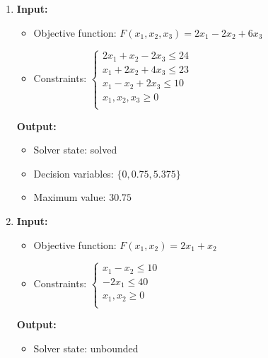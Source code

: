 \documentclass{article}
\begin{document}
\begin{enumerate}[label={(\arabic*)}]
          \vspace{0.25in}

    \item \textbf{Input:}
          \begin{itemize}
              \item Objective function: \(F(x_1, x_2, x_3) = 2 x_1 - 2 x_2 + 6 x_3\)
              \item Constraints: \(\begin{cases}
                        2 x_1 + x_2 - 2 x_3 \le 24 \\
                        x_1 + 2 x_2 + 4 x_3 \le 23 \\
                        x_1 - x_2 + 2 x_3 \le 10   \\
                        x_1, x_2, x_3 \ge 0        \\
                    \end{cases}\)
          \end{itemize}

          \textbf{Output:}
          \begin{itemize}
              \item Solver state: solved
              \item Decision variables: \({\{ 0, 0.75, 5.375 \}}\)
              \item Maximum value: \(30.75\)
          \end{itemize}

          \vspace{0.25in}

    \item \textbf{Input:}
          \begin{itemize}
              \item Objective function: \(F(x_1, x_2) = 2 x_1 + x_2\)
              \item Constraints: \(\begin{cases}
                        x_1 - x_2 \le 10 \\
                        -2 x_1 \le 40    \\
                        x_1, x_2 \ge 0   \\
                    \end{cases}\)
          \end{itemize}

          \textbf{Output:}
          \begin{itemize}
              \item Solver state: unbounded
          \end{itemize}


\end{enumerate}
\end{document}
